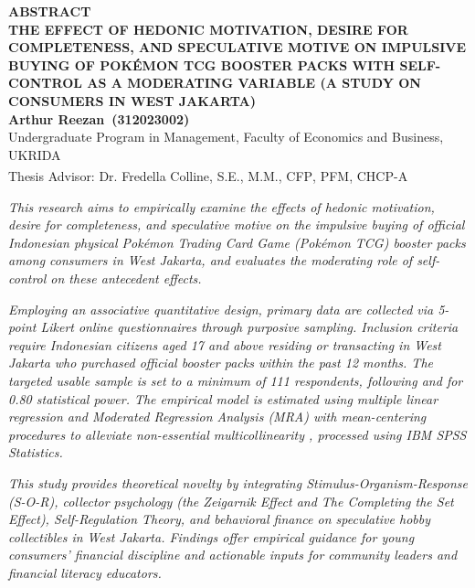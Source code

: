 \documentclass[12pt,a4paper]{article}
\numberwithin{equation}{section}
\numberwithin{table}{section}
\numberwithin{figure}{section}
\newcommand{\namamahasiswa}{Arthur Reezan}
\newcommand{\nim}{312023002}
\newcommand{\dosbim}{Dr. Fredella Colline, S.E., M.M., CFP\textsuperscript{\textregistered}, PFM, CHCP-A}
\begin{document}
\newpage
\thispagestyle{frontmatter}
{}
\begin{singlespace}
\begin{center}
  {\large\bfseries ABSTRACT}\\[0.15cm]
  {\bfseries THE EFFECT OF HEDONIC MOTIVATION, DESIRE FOR COMPLETENESS, AND SPECULATIVE MOTIVE ON IMPULSIVE BUYING OF POK\'EMON TCG BOOSTER PACKS WITH SELF-CONTROL AS A MODERATING VARIABLE (A STUDY ON CONSUMERS IN WEST JAKARTA)}\\[0.15cm]
  {\bfseries\namamahasiswa\ (\nim)}\\[0.05cm]
  {\footnotesize Undergraduate Program in Management, Faculty of Economics and Business, UKRIDA}\\[0.05cm]
  {\footnotesize Thesis Advisor: \dosbim}
\end{center}

\vspace{0.1cm}
\emph{This research aims to empirically examine the effects of hedonic motivation, desire for completeness, and speculative motive on the impulsive buying of official Indonesian physical Pok\'emon Trading Card Game (Pok\'emon TCG) booster packs among consumers in West Jakarta, and evaluates the moderating role of self-control on these antecedent effects.}

\emph{Employing an associative quantitative design, primary data are collected via 5-point Likert online questionnaires through purposive sampling. Inclusion criteria require Indonesian citizens aged 17 and above residing or transacting in West Jakarta who purchased official booster packs within the past 12 months. The targeted usable sample is set to a minimum of 111 respondents, following \citet{green1991subjects} and \citet{cohen1988statistical} for 0.80 statistical power. The empirical model is estimated using multiple linear regression and Moderated Regression Analysis (MRA) with mean-centering procedures to alleviate non-essential multicollinearity \citep{aiken1991multiple, hayes2018introduction}, processed using IBM SPSS Statistics.}

\emph{This study provides theoretical novelty by integrating Stimulus-Organism-Response (S-O-R), collector psychology (the Zeigarnik Effect and The Completing the Set Effect), Self-Regulation Theory, and behavioral finance on speculative hobby collectibles in West Jakarta. Findings offer empirical guidance for young consumers' financial discipline and actionable inputs for community leaders and financial literacy educators.}


\end{singlespace}
\end{document}
